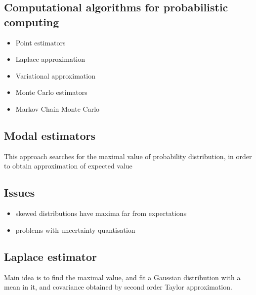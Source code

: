 \documentclass[letterpaper,10pt,english]{jupyterBook}
\begin{document}
\subsection{Computational algorithms for probabilistic computing}
\label{\detokenize{Lecture 3:computational-algorithms-for-probabilistic-computing}}\begin{itemize}
\item {} 
\sphinxAtStartPar
Point estimators

\item {} 
\sphinxAtStartPar
Laplace approximation

\item {} 
\sphinxAtStartPar
Variational approximation

\item {} 
\sphinxAtStartPar
Monte Carlo estimators

\item {} 
\sphinxAtStartPar
Markov Chain Monte Carlo

\end{itemize}


\subsection{Modal estimators}
\label{\detokenize{Lecture 3:modal-estimators}}
\sphinxAtStartPar
This approach searches for the maximal value of probability distribution, in order to obtain approximation of expected value






\subsection{Issues}
\label{\detokenize{Lecture 3:issues}}\begin{itemize}
\item {} 
\sphinxAtStartPar
skewed distributions have maxima far from expectations

\item {} 
\sphinxAtStartPar
problems with uncertainty quantisation

\end{itemize}






\subsection{Laplace estimator}
\label{\detokenize{Lecture 3:laplace-estimator}}
\sphinxAtStartPar
Main idea is to find the maximal value, and fit a Gaussian distribution with a mean in it, and covariance obtained by second order Taylor approximation.
\end{document}
